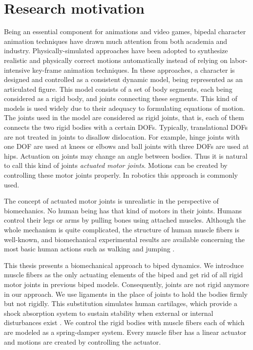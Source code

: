 \documentclass[master,english,final]{kaist-ucs}
\begin{document}
\section{Research motivation}
Being an essential component for animations and video games,
bipedal character animation techniques have drawn much attention from
both academia and industry. Physically-simulated approaches have been
adopted to synthesize realistic and physically correct motions
automatically instead of relying on labor-intensive key-frame animation
techniques. In these approaches, a character is designed and controlled
as a consistent dynamic model, being represented as an articulated
figure. This model consists of a set of body segments, each being
considered as a rigid body, and joints connecting these segments.
This kind of models is used widely due to their adequacy to formulating
equations of motion.
The joints used in the model are considered as rigid joints,
that is, each of them connects the two rigid bodies with a certain DOFs.
Typically, translational DOFs are not treated in joints to disallow dislocation.
For example, hinge joints with one DOF are used at knees or elbows and
ball joints with three DOFs are used at hips. Actuation on joints may change
an angle between bodies. Thus it is natural to call this kind of joints
\emph{actuated motor joints}. Motions can be created by
controlling these motor joints properly. In robotics this approach is
commonly used.

The concept of actuated motor joints is unrealistic in the perspective of
biomechanics. No human being has that kind of motors in their joints.
Humans control their legs or arms by pulling bones using attached
muscles. Although the whole mechanism is quite complicated,
the structure of human muscle fibers is well-known, and biomechanical
experimental results are available concerning the most basic human actions
such as walking and jumping \cite{citeulike:2547705, citeulike:7093575}.

This thesis presents a biomechanical approach to biped dynamics. We
introduce muscle fibers as the only actuating elements
of the biped and get rid of all rigid motor joints in previous biped
models. Consequently, joints are not rigid anymore in our approach.
We use ligaments in the place of joints
to hold the bodies firmly but not rigidly. This substitution
simulates human cartilages, which provide a shock absorption
system to sustain stability when external or internal disturbances exist \cite{shock}.
We control the rigid bodies with muscle fibers each of which are modeled as
a spring-damper system. Every muscle fiber has a linear actuator and
motions are created by controlling the actuator.
\end{document}
